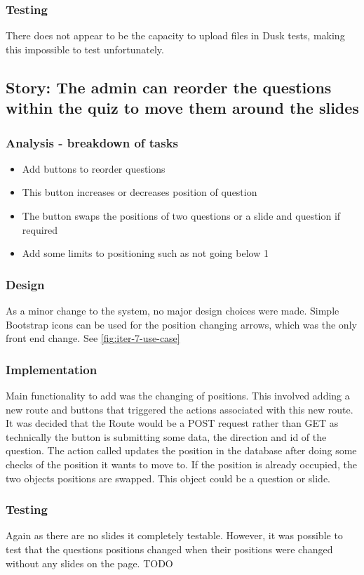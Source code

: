 \subsubsection{Testing}
There does not appear to be the capacity to upload files in Dusk tests, making this impossible to test unfortunately.
\newpage

\subsection{Story: The admin can reorder the questions within the quiz to move them around the slides}
\subsubsection{Analysis - breakdown of tasks}
\begin{itemize}
	\item Add buttons to reorder questions
	\item This button increases or decreases position of question
	\item The button swaps the positions of two questions or a slide and question if required
	\item Add some limits to positioning such as not going below 1
\end{itemize}
\subsubsection{Design}
As a minor change to the system, no major design choices were made. Simple Bootstrap icons can be used for the position changing arrows, which was the only front end change.
See \ref{fig:iter-7-use-case} 
\subsubsection{Implementation}
Main functionality to add was the changing of positions. This involved adding a new route and buttons that triggered the actions associated with this new route. It was decided that the Route would be a POST request rather than GET as technically the button is submitting some data, the direction and id of the question. The action called updates the position in the database after doing some checks of the position it wants to move to. If the position is already occupied, the two objects positions are swapped. This object could be a question or slide.   
\subsubsection{Testing}
Again as there are no slides it completely testable. However, it was possible to test that the questions positions changed when their positions were changed without any slides on the page. TODO
\newpage

